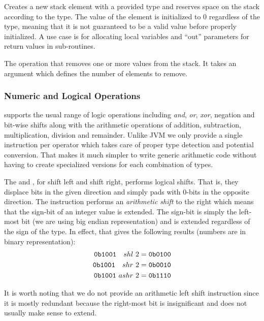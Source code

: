 \begin{description}
  Creates a new stack element with a provided type and reserves space on the
  stack according to the type. The value of the element is initialized to 0
  regardless of the type, meaning that it is not guaranteed to be a valid value
  before properly initialized. A use case is for allocating local variables and
  ``out'' parameters for return values in sub-routines.

\item[\instr{pop}:]

  The operation that removes one or more values from the stack. It takes an
  argument which defines the number of elements to remove.

\end{description}

\subsubsection{Numeric and Logical Operations}
\label{sec:design:stack:logic}

\thename{} supports the usual range of logic operations including \emph{and},
\emph{or}, \emph{xor}, negation and bit-wise shifts along with the arithmetic
operations of addition, subtraction, multiplication, division and
remainder. Unlike JVM we only provide a single instruction per operator which
takes care of proper type detection and potential conversion. That makes it much
simpler to write generic arithmetic code without having to create specialized
versions for each combination of types.

The  and , for shift left and shift right,
performs logical shifts. That is, they displace bits in the given direction and
simply pads with 0-bits in the opposite direction. The 
instruction performs an \textit{arithmetic shift} to the right which means that
the sign-bit of an integer value is extended. The sign-bit is simply the
left-most bit (we are using big endian representation) and is extended
regardless of the sign of the type. In effect, that gives the following results
(numbers are in binary representation):
\begin{align*}
  {\tt 0b1001}\ \ \ shl\  2 &= {\tt 0b0100} \\
  {\tt 0b1001}\ \ \ shr\  2 &= {\tt 0b0010} \\
  {\tt 0b1001}\     ashr\ 2 &= {\tt 0b1110}
\end{align*}

It is worth noting that we do not provide an arithmetic left shift instruction
since it is mostly redundant because the right-most bit is insignificant and
does not usually make sense to extend.

